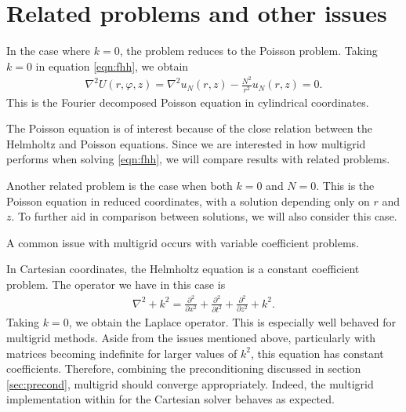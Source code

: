 
\section{Related problems and other issues}

In the case where $k=0$, the problem reduces to the Poisson problem.
Taking $k=0$ in equation \eqref{eqn:fhh}, we obtain
\begin{align}
	\nabla^2 U(r,\varphi,z) = \nabla^2 u_N(r,z) - \frac{N^2}{r^2} u_N(r,z) = 0. \label{eqn:fp}
\end{align}
This is the Fourier decomposed Poisson equation in cylindrical coordinates.

The Poisson equation is of interest because of the close relation between the Helmholtz and Poisson equations.
Since we are interested in how multigrid performs when solving \eqref{eqn:fhh}, we will compare results with related problems.

Another related problem is the case when both $k=0$ and $N=0$.
This is the Poisson equation in reduced coordinates, with a solution depending only on $r$ and $z$.
To further aid in comparison between solutions, we will also consider this case.



A common issue with multigrid occurs with variable coefficient problems.
\cite{briggs}

In Cartesian coordinates, the Helmholtz equation is a constant coefficient problem.
The operator we have in this case is
\begin{align}
	\nabla^2 + k^2 = \frac{\partial^2}{\partial x^2} + \frac{\partial^2}{\partial t^2} + \frac{\partial^2}{\partial z^2} + k^2.
\end{align}
Taking $k=0$, we obtain the Laplace operator.
This is especially well behaved for multigrid methods.
Aside from the issues mentioned above, particularly with matrices becoming indefinite for larger values of $k^2$, this equation has constant coefficients.
Therefore, combining the preconditioning discussed in section \ref{sec:precond}, multigrid should converge appropriately.
Indeed, the multigrid implementation within \oomph for the Cartesian solver behaves as expected.

